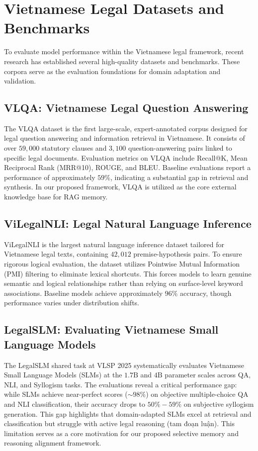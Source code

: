 \section{Vietnamese Legal Datasets and Benchmarks}

To evaluate model performance within the Vietnamese legal framework, recent research has established several high-quality datasets and benchmarks. These corpora serve as the evaluation foundations for domain adaptation and validation.

\subsection{VLQA: Vietnamese Legal Question Answering}
The VLQA dataset \parencite{nguyen2025vlqacomprehensivelargehighquality} is the first large-scale, expert-annotated corpus designed for legal question answering and information retrieval in Vietnamese. It consists of over $59,000$ statutory clauses and $3,100$ question-answering pairs linked to specific legal documents. Evaluation metrics on VLQA include Recall@K, Mean Reciprocal Rank (MRR@10), ROUGE, and BLEU. Baseline evaluations report a performance of approximately $59\%$, indicating a substantial gap in retrieval and synthesis. In our proposed framework, VLQA is utilized as the core external knowledge base for RAG memory.

\subsection{ViLegalNLI: Legal Natural Language Inference}
ViLegalNLI \parencite{duong2026vilegalnlinaturallanguageinference} is the largest natural language inference dataset tailored for Vietnamese legal texts, containing $42,012$ premise-hypothesis pairs. To ensure rigorous logical evaluation, the dataset utilizes Pointwise Mutual Information (PMI) filtering to eliminate lexical shortcuts. This forces models to learn genuine semantic and logical relationships rather than relying on surface-level keyword associations. Baseline models achieve approximately $96\%$ accuracy, though performance varies under distribution shifts.

\subsection{LegalSLM: Evaluating Vietnamese Small Language Models}
The LegalSLM shared task at VLSP 2025 \parencite{le-etal-2025-overview} systematically evaluates Vietnamese Small Language Models (SLMs) at the $1.7\text{B}$ and $4\text{B}$ parameter scales across QA, NLI, and Syllogism tasks. The evaluations reveal a critical performance gap: while SLMs achieve near-perfect scores ($\sim 98\%$) on objective multiple-choice QA and NLI classification, their accuracy drops to $50\% - 59\%$ on subjective syllogism generation. This gap highlights that domain-adapted SLMs excel at retrieval and classification but struggle with active legal reasoning (tam đoạn luận). This limitation serves as a core motivation for our proposed selective memory and reasoning alignment framework.

